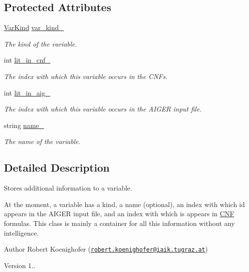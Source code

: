 \subsection*{Protected Attributes}
\begin{DoxyCompactItemize}
\item 
\hyperlink{classVarInfo_a64d1da76cf84fe674e5fef9764ef11cf}{Var\-Kind} \hyperlink{classVarInfo_aabed2d542c10abb83514e4592913b431}{var\-\_\-kind\-\_\-}
\begin{DoxyCompactList}\small\item\em The kind of the variable. \end{DoxyCompactList}\item 
int \hyperlink{classVarInfo_aa9937f8bae554d520b194c4d97df4b64}{lit\-\_\-in\-\_\-cnf\-\_\-}
\begin{DoxyCompactList}\small\item\em The index with which this variable occurs in the C\-N\-Fs. \end{DoxyCompactList}\item 
int \hyperlink{classVarInfo_ae0bf3d35787614131a642bea83d30555}{lit\-\_\-in\-\_\-aig\-\_\-}
\begin{DoxyCompactList}\small\item\em The index with which this variable occurs in the A\-I\-G\-E\-R input file. \end{DoxyCompactList}\item 
string \hyperlink{classVarInfo_a82a85d0c811c2e5501401bd42463371b}{name\-\_\-}
\begin{DoxyCompactList}\small\item\em The name of the variable. \end{DoxyCompactList}\end{DoxyCompactItemize}


\subsection{Detailed Description}
Stores additional information to a variable. 

At the moment, a variable has a kind, a name (optional), an index with which id appears in the A\-I\-G\-E\-R input file, and an index with which is appears in \hyperlink{classCNF}{C\-N\-F} formulas. This class is mainly a container for all this information without any intelligence.

\begin{DoxyAuthor}{Author}
Robert Koenighofer (\href{mailto:robert.koenighofer@iaik.tugraz.at}{\tt robert.\-koenighofer@iaik.\-tugraz.\-at}) 
\end{DoxyAuthor}
\begin{DoxyVersion}{Version}
1.. 
\end{DoxyVersion}


